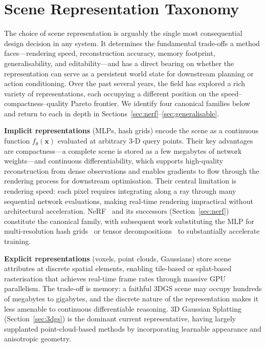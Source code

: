 \section{Scene Representation Taxonomy}
\label{sec:representation}

The choice of scene representation is arguably the single most consequential
design decision in any \nvs{} system.
It determines the fundamental trade-offs a method faces---rendering speed,
reconstruction accuracy, memory footprint, generalisability, and
editability---and has a direct bearing on whether the representation can
serve as a persistent world state for downstream planning or action conditioning.
Over the past several years, the field has explored a rich variety of
representations, each occupying a different position on the
speed--compactness--quality Pareto frontier.
We identify four canonical families below and return to each in depth in
Sections~\ref{sec:nerf}--\ref{sec:generalisable}.

\textbf{Implicit representations} (MLPs, hash grids) encode the scene as a
continuous function $f_\theta(\mathbf{x})$ evaluated at arbitrary 3-D query
points.
Their key advantages are compactness---a complete scene is stored as a
few megabytes of network weights---and continuous differentiability, which
supports high-quality reconstruction from dense observations and enables
gradients to flow through the rendering process for downstream optimisation.
Their central limitation is rendering speed: each pixel requires integrating
along a ray through many sequential network evaluations, making real-time
rendering impractical without architectural acceleration.
NeRF~\citep{mildenhall2020nerf} and its successors (Section~\ref{sec:nerf})
constitute the canonical family, with subsequent work substituting the MLP
for multi-resolution hash grids~\citep{muller2022instant} or tensor
decompositions~\citep{chen2022tensorf} to substantially accelerate training.

\textbf{Explicit representations} (voxels, point clouds, Gaussians) store scene
attributes at discrete spatial elements, enabling tile-based or splat-based
rasterisation that achieves real-time frame rates through massive GPU
parallelism.
The trade-off is memory: a faithful 3DGS scene may occupy hundreds of
megabytes to gigabytes, and the discrete nature of the representation
makes it less amenable to continuous differentiable reasoning.
3D Gaussian Splatting~\citep{kerbl2023gaussian} (Section~\ref{sec:3dgs}) is
the dominant current representative, having largely supplanted point-cloud-based
methods by incorporating learnable appearance and anisotropic geometry.

